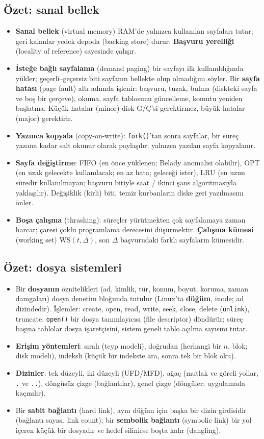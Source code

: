 \documentclass[11pt,a4paper]{article}
\newcommand{\term}[1]{\textbf{\color{mintdeep}#1}}
\newcommand{\cmd}[1]{\texttt{#1}}
\begin{document}
\subsection*{Özet: sanal bellek}
\begin{itemize}
  \item \term{Sanal bellek} (virtual memory) RAM'de yalnızca kullanılan sayfaları tutar; geri kalanlar yedek depoda (backing store) durur. \term{Başvuru yerelliği} (locality of reference) sayesinde çalışır.
  \item \term{İsteğe bağlı sayfalama} (demand paging) bir sayfayı ilk kullanıldığında yükler; geçerli--geçersiz biti sayfanın bellekte olup olmadığını söyler. Bir \term{sayfa hatası} (page fault) altı adımda işlenir: başvuru, tuzak, bulma (diskteki sayfa ve boş bir çerçeve), okuma, sayfa tablosunu güncelleme, komutu yeniden başlatma. Küçük hatalar (minor) disk G/Ç'si gerektirmez, büyük hatalar (major) gerektirir.
  \item \term{Yazınca kopyala} (copy-on-write): \cmd{fork()}'tan sonra sayfalar, bir süreç yazana kadar salt okunur olarak paylaşılır; yalnızca yazılan sayfa kopyalanır.
  \item \textbf{Sayfa değiştirme}: FIFO (en önce yüklenen; Belady anomalisi olabilir), OPT (en uzak gelecekte kullanılacak; en az hata; geleceği ister), LRU (en uzun süredir kullanılmayan; başvuru bitiyle saat / ikinci şans algoritmasıyla yaklaşılır). Değişiklik (kirli) biti, temiz kurbanların diske geri yazılmasını önler.
  \item \term{Boşa çalışma} (thrashing): süreçler yürütmekten çok sayfalamaya zaman harcar; çaresi çoklu programlama derecesini düşürmektir. \term{Çalışma kümesi} (working set) $\text{WS}(t,\Delta)$, son $\Delta$ başvurudaki farklı sayfaların kümesidir.
\end{itemize}
\subsection*{Özet: dosya sistemleri}
\begin{itemize}
  \item Bir \term{dosyanın} öznitelikleri (ad, kimlik, tür, konum, boyut, koruma, zaman damgaları) dosya denetim bloğunda tutulur (Linux'ta \term{düğüm}, inode; ad dizindedir). İşlemler: create, open, read, write, seek, close, delete (\cmd{unlink}), truncate. \cmd{open()} bir dosya tanımlayıcısı (file descriptor) döndürür; süreç başına tablolar dosya işaretçisini, sistem geneli tablo açılma sayısını tutar.
  \item \textbf{Erişim yöntemleri}: sıralı (teyp modeli), doğrudan (herhangi bir $n$. blok; disk modeli), indeksli (küçük bir indekste ara, sonra tek bir blok oku).
  \item \textbf{Dizinler}: tek düzeyli, iki düzeyli (UFD/MFD), ağaç (mutlak ve göreli yollar, \texttt{.} ve \texttt{..}), döngüsüz çizge (bağlantılar), genel çizge (döngüler; uygulamada kaçınılır).
  \item Bir \term{sabit bağlantı} (hard link), aynı düğüm için başka bir dizin girdisidir (bağlantı sayısı, link count); bir \term{sembolik bağlantı} (symbolic link) bir yol içeren küçük bir dosyadır ve hedef silinirse boşta kalır (dangling).
\end{itemize}
\end{document}
